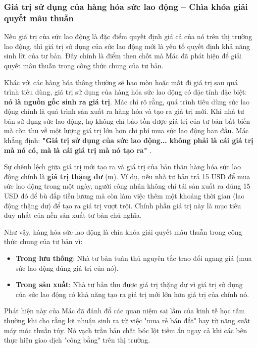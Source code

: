 \subsubsection{Giá trị sử dụng của hàng hóa sức lao động – Chìa khóa giải quyết mâu thuẫn}
Nếu giá trị của sức lao động là đặc điểm quyết định giá cả của nó trên thị trường lao động, thì giá trị sử dụng của sức lao động mới là yếu tố quyết định khả năng sinh lời của tư bản. Đây chính là điểm then chốt mà Mác đã phát hiện để giải quyết mâu thuẫn trong công thức chung của tư bản.

Khác với các hàng hóa thông thường sẽ hao mòn hoặc mất đi giá trị sau quá trình tiêu dùng, giá trị sử dụng của hàng hóa sức lao động có đặc tính đặc biệt: \textbf{nó là nguồn gốc sinh ra giá trị}. Mác chỉ rõ rằng, quá trình tiêu dùng sức lao động chính là quá trình sản xuất ra hàng hóa và tạo ra giá trị mới. Khi nhà tư bản sử dụng sức lao động, họ không chỉ bảo tồn được giá trị của tư bản bất biến mà còn thu về một lượng giá trị lớn hơn chi phí mua sức lao động ban đầu. Mác khẳng định: \textbf{"Giá trị sử dụng của sức lao động... không phải là cái giá trị mà nó có, mà là cái giá trị mà nó tạo ra"} \cite[trang 287]{marx_engels_23}.

Sự chênh lệch giữa giá trị mới tạo ra và giá trị của bản thân hàng hóa sức lao động chính là \textbf{giá trị thặng dư} (m). Ví dụ, nếu nhà tư bản trả 15 USD để mua sức lao động trong một ngày, người công nhân không chỉ tái sản xuất ra đúng 15 USD đó để bù đắp tiền lương mà còn làm việc thêm một khoảng thời gian (lao động thặng dư) để tạo ra giá trị vượt trội. Chính phần giá trị này là mục tiêu duy nhất của nền sản xuất tư bản chủ nghĩa.

Như vậy, hàng hóa sức lao động là chìa khóa giải quyết mâu thuẫn trong công thức chung của tư bản vì:
\begin{itemize}
    \item \textbf{Trong lưu thông}: Nhà tư bản tuân thủ nguyên tắc trao đổi ngang giá (mua sức lao động đúng giá trị của nó).
    \item \textbf{Trong sản xuất}: Nhà tư bản thu được giá trị thặng dư vì giá trị sử dụng của sức lao động có khả năng tạo ra giá trị mới lớn hơn giá trị của chính nó.
\end{itemize}
Phát hiện này của Mác đã đánh đổ các quan niệm sai lầm của kinh tế học tầm thường khi cho rằng lợi nhuận sinh ra từ việc "mua rẻ bán đắt" hay từ năng suất máy móc thuần túy. Nó vạch trần bản chất bóc lột tiềm ẩn ngay cả khi các bên thực hiện giao dịch "công bằng" trên thị trường.

